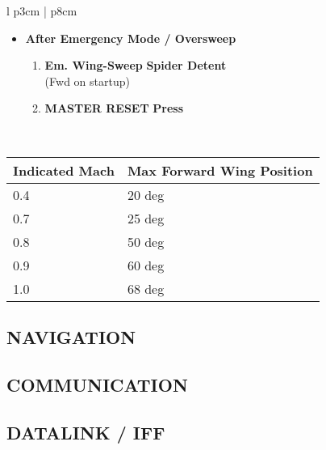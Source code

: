 \documentclass[8pt,usenames,dvipsnames,twoside]{article}
\begin{document}
\begin{center}
\begin{longtable}{l p{3cm} | p{8cm}}
\begin{minipage}[t]{\linewidth}
					\vspace{-7pt}
					\begin{itemize}
						\item \textbf{After Emergency Mode / Oversweep}
						\begin{enumerate}[label=(\alph*)]
							\item \textbf{Em. Wing-Sweep} \dotfill \textbf{Spider Detent} \\
							\hfill (Fwd on startup)
							\item \textbf{MASTER RESET} \dotfill \textbf{Press}
						\end{enumerate}
					\end{itemize}
				\end{minipage} \\
				\bottomrule
			\end{longtable}
		\end{center}
		\begin{center}
			\begin{tabular}{p{3cm} | p{5cm}}
				\toprule
				\textbf{Indicated Mach} & \textbf{Max Forward Wing Position} \\
				\midrule
				0.4 & 20 deg \\
				\midrule
				0.7 & 25 deg \\
				\midrule
				0.8 & 50 deg \\
				\midrule
				0.9 & 60 deg \\
				\midrule
				1.0 & 68 deg \\
				\bottomrule
			\end{tabular}
		\end{center}
	
		\subsection{NAVIGATION}
		\subsection{COMMUNICATION}
		\subsection{DATALINK / IFF}
		
		\clearpage
\end{document}
